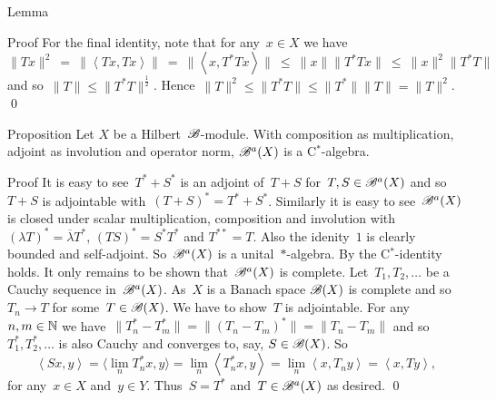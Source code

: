 \documentclass[b]{subfiles}
\begin{document}
\begin{parsec}
\begin{point}{Lemma}
\begin{point}{Proof}
For the final identity, note that for any~$x \in X$ we have
\begin{equation*}
\|Tx\|^2 \ =\  \|\left<Tx,Tx\right>\| 
            \ =\  \| \left<x, T^*Tx\right>\|
            \ \leq\  \|x \| \|T^*Tx \|
            \ \leq\  \|x\|^2 \|T^*T\|
\end{equation*}
and so~$\|T\| \leq \|T^*T\|^{\frac{1}{2}}$.
Hence~$\|T\|^2 \leq \|T^*T\| \leq \|T^*\|\|T\| = \|T\|^2$.
    \qed
\end{point}
\end{point}
\begin{point}{Proposition}%
Let $X$ be a Hilbert~$\mathscr{B}$-module.
With composition as multiplication,
    adjoint as involution
    and operator norm,
     $\mathscr{B}^a(X)$ is a C$^*$-algebra.
\begin{point}{Proof}
It is easy to see~$T^*+S^*$ is an adjoint of~$T+S$
    for~$T,S \in \mathscr{B}^a(X)$
    and so~$T+S$ is adjointable with~$(T+S)^* = T^*+ S^*$.
    Similarly it is easy to see~$\mathscr{B}^a(X)$
        is closed under scalar multiplication, composition and involution
        with~$(\lambda T)^* = \overline{\lambda} T^* $,
            $(TS)^* = S^*T^*$ and
            $T^{**} =T$.
Also the idenity~$1$ is clearly bounded and self-adjoint.
So~$\mathscr{B}^a(X)$ is a unital~$*$-algebra.
By  
    the C$^*$-identity holds.
It only remains to be shown that~$\mathscr{B}^a(X)$ is complete.
Let~$T_1,T_2,\ldots$ be a Cauchy sequence in~$\mathscr{B}^a(X)$.
As~$X$ is a Banach space $\mathscr{B}(X)$ is complete
    and so~$T_n \to T$ for some~$T \in \mathscr{B}(X)$.
We have to show~$T$ is adjointable.
For any~$n,m \in \mathbb{N}$ we have~$\|T_n^* - T_m^*\|
= \|(T_n - T_m)^*\| = \|T_n - T_m\|$
and so~$T^*_1, T^*_2,\ldots$
is also Cauchy
and converges to, say, $S \in \mathscr{B}(X)$.
So
\begin{equation*}
\left<S x, y\right> =
\langle\lim_{n} T^*_n x, y\rangle = \lim_n \left<T_n^* x, y\right>
                = \lim_n \left<x, T_n y\right>
                =  \left<x, T y\right>,
\end{equation*}
for any~$x \in X$ and~$y \in Y$.
Thus~$S = T^*$ and~$T \in \mathscr{B}^a(X)$ as desired. \qed
\end{point}
\end{point}
\end{parsec}
\end{document}
